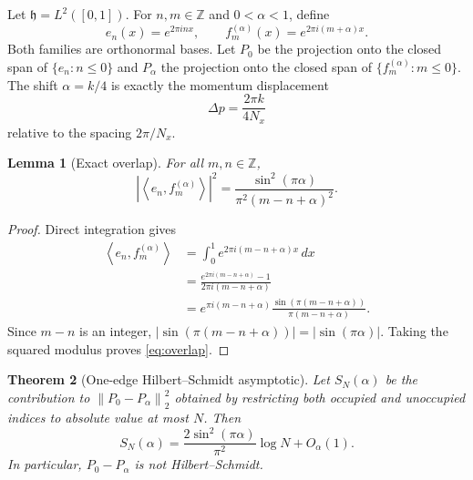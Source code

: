 \documentclass[11pt]{article}
\newtheorem{theorem}{Theorem}[section]
\newtheorem{lemma}[theorem]{Lemma}
\theoremstyle{remark}
\newcommand{\Z}{\mathbb Z}
\newcommand{\norm}[1]{\left\lVert #1\right\rVert}
\newcommand{\ip}[2]{\left\langle #1,#2\right\rangle}
\begin{document}
Let $\mathfrak h=L^2([0,1])$.  For $n,m\in\Z$ and
$0<\alpha<1$, define
\[
 e_n(x)=e^{2\pi inx},\qquad
 f_m^{(\alpha)}(x)=e^{2\pi i(m+\alpha)x}.
\]
Both families are orthonormal bases.  Let $P_0$ be the projection onto
the closed span of $\{e_n:n\le0\}$ and $P_\alpha$ the projection onto
the closed span of $\{f_m^{(\alpha)}:m\le0\}$.  The shift
$\alpha=k/4$ is exactly the momentum displacement
\[
 \Delta p=\frac{2\pi k}{4N_x}
\]
relative to the spacing $2\pi/N_x$.

\begin{lemma}[Exact overlap]\label{lem:overlap}
For all $m,n\in\Z$,
\[
 \left|\ip{e_n}{f_m^{(\alpha)}}\right|^2
 =\frac{\sin^2(\pi\alpha)}
 {\pi^2(m-n+\alpha)^2}.
\tag{5.1}\label{eq:overlap}
\]
\end{lemma}

\begin{proof}
Direct integration gives
\[
\begin{aligned}
\ip{e_n}{f_m^{(\alpha)}}
&=\int_0^1e^{2\pi i(m-n+\alpha)x}\,dx\\
&=\frac{e^{2\pi i(m-n+\alpha)}-1}
 {2\pi i(m-n+\alpha)}\\
&=e^{\pi i(m-n+\alpha)}
\frac{\sin(\pi(m-n+\alpha))}
 {\pi(m-n+\alpha)}.
\end{aligned}
\]
Since $m-n$ is an integer,
$|\sin(\pi(m-n+\alpha))|=|\sin(\pi\alpha)|$.
Taking the squared modulus proves \eqref{eq:overlap}.
\end{proof}

\begin{theorem}[One-edge Hilbert--Schmidt asymptotic]
\label{thm:oneedge}
Let $S_N(\alpha)$ be the contribution to
$\norm{P_0-P_\alpha}_2^2$ obtained by restricting both occupied and
unoccupied indices to absolute value at most $N$.  Then
\[
 S_N(\alpha)
 =\frac{2\sin^2(\pi\alpha)}{\pi^2}\log N+O_\alpha(1).
\tag{5.2}\label{eq:one-edge-log}
\]
In particular, $P_0-P_\alpha$ is not Hilbert--Schmidt.
\end{theorem}
\end{document}

